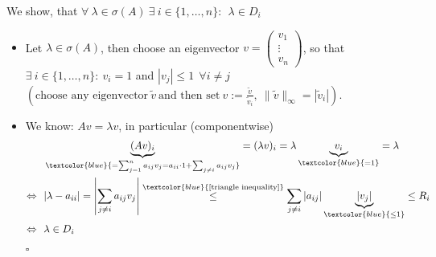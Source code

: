 {\color{solution}
We show, that $\forall~\lambda\in\sigma(A)~\exists~i\in\{1,\dots,n\}:~~\lambda\in D_i$
\begin{itemize}
	\item 
	Let $\lambda\in\sigma(A)$, then choose an eigenvector $v=\begin{pmatrix}v_1\\\vdots\\v_n\end{pmatrix}$, so that\\ $\exists~i\in\{1,\dots,n\}:~v_i=1$ and $|v_j|\leq 1~~\forall i\neq j$\\ $\left(\text{choose any eigenvector}~ \tilde{v}~ \text{and then set}~ v:=\frac{\tilde{v}}{\tilde{v}_i},~\|\tilde{v}\|_\infty =|\tilde{v}_i|\right)$.
	\item 
	We know: $Av=\lambda v$, in particular (componentwise)
	\begin{align*}
	&\underbrace{(Av)_i}_{\textcolor{blue}{=\sum_{j=1}^{n}a_{ij}v_j=a_{ii}\cdot 1+\sum_{j\neq i}a_{ij}v_j}}=(\lambda v)_i =\lambda \underbrace{v_i}_{\textcolor{blue}{=1}}=\lambda\\
	\Leftrightarrow~~&|\lambda-a_{ii}|=\left|\sum_{j\neq i}a_{ij}v_j\right|\stackrel{\textcolor{blue}{[\text{triangle inequality}]}}{\leq}\sum_{j\neq i}|a_{ij}|\underbrace{|v_j|}_{\textcolor{blue}{\leq 1}}\leq R_i\\
	\Leftrightarrow~~&\lambda\in D_i
	\end{align*}
	\begin{flushright}$\square$\end{flushright}
\end{itemize}
}